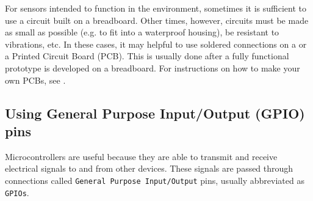 %


%

\begin{kaobox}[frametitle=Board with circuit design \dots]
	For sensors intended to function in the environment, sometimes it is sufficient to use a circuit built on a breadboard.
	Other times, however, circuits must be made as small as possible (e.g. to fit into a waterproof housing), be resistant to vibrations, etc.
	In these cases, it may helpful to use soldered connections on a  or a Printed Circuit Board (PCB).
	This is usually done after a fully functional prototype is developed on a breadboard.
	For instructions on how to make your own PCBs, see .
\end{kaobox}%

\subsection{Using General Purpose Input/Output (GPIO) pins}
Microcontrollers are useful because they are able to transmit and receive electrical signals to and from other devices.
These signals are passed through connections called \texttt{General Purpose Input/Output} pins, usually abbreviated as \texttt{GPIOs}.

